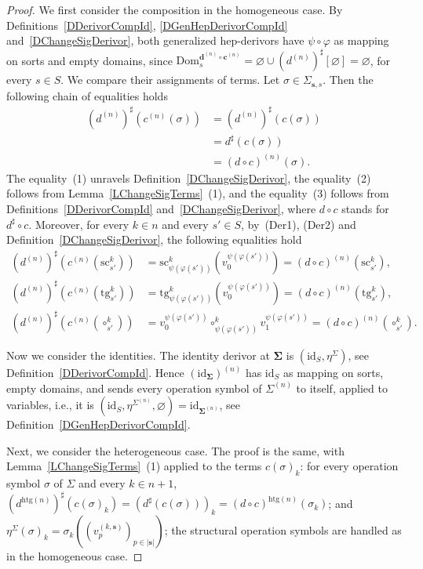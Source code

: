 \documentclass[a4paper, reqno]{amsbook}
\newcommand{\bb}[1]{\ensuremath{\lvert #1 \rvert}}
\newcommand{\sig}[1]{\mathbf{#1}}             %
\newcommand{\Dom}{\mathrm{Dom}}
\newcommand{\htg}{\mathrm{htg}}                %
\newcommand{\id}{\mathrm{id}}
\newcommand{\src}{\mathrm{sc}}
\newcommand{\tgt}{\mathrm{tg}}
\theoremstyle{plain}
\theoremstyle{definition}
\begin{document}
\begin{proof}
We first consider the composition in the homogeneous case.
By Definitions~\ref{DDerivorCompId}, \ref{DGenHepDerivorCompId} and~\ref{DChangeSigDerivor}, both generalized hep-derivors have $\psi\circ\varphi$ as mapping on sorts and empty domains, since $\Dom^{\mathbf{d}^{(n)}\circ\mathbf{c}^{(n)}}_{s}=\varnothing\cup(d^{(n)})^{\sharp}[\varnothing]=\varnothing$, for every $s\in S$.
We compare their assignments of terms.
Let $\sigma\in\Sigma_{\mathbf{s},s}$.
Then the following chain of equalities holds
\begin{align*}
(d^{(n)})^{\sharp}\left(c^{(n)}(\sigma)\right)
&=
(d^{(n)})^{\sharp}\left(c(\sigma)\right)
\tag{1}
\\&=
d^{\sharp}\left(c(\sigma)\right)
\tag{2}
\\&=
(d\circ c)^{(n)}(\sigma).
\tag{3}
\end{align*}
The equality~(1) unravels Definition~\ref{DChangeSigDerivor}, the equality~(2) follows from Lemma~\ref{LChangeSigTerms}~(1), and the equality~(3) follows from Definitions~\ref{DDerivorCompId} and~\ref{DChangeSigDerivor}, where $d\circ c$ stands for $d^{\sharp}\circ c$.
Moreover, for every $k\in n$ and every $s'\in S$, by~(Der1), (Der2) and Definition~\ref{DChangeSigDerivor}, the following equalities hold
\begin{align*}
(d^{(n)})^{\sharp}\left(c^{(n)}(\src^{k}_{s'})\right)&=\src^{k}_{\psi(\varphi(s'))}\left(v^{\psi(\varphi(s'))}_{0}\right)=(d\circ c)^{(n)}(\src^{k}_{s'}),\\
(d^{(n)})^{\sharp}\left(c^{(n)}(\tgt^{k}_{s'})\right)&=\tgt^{k}_{\psi(\varphi(s'))}\left(v^{\psi(\varphi(s'))}_{0}\right)=(d\circ c)^{(n)}(\tgt^{k}_{s'}),\\
(d^{(n)})^{\sharp}\left(c^{(n)}(\circ^{k}_{s'})\right)&=v^{\psi(\varphi(s'))}_{0}\circ^{k}_{\psi(\varphi(s'))}v^{\psi(\varphi(s'))}_{1}=(d\circ c)^{(n)}(\circ^{k}_{s'}).
\end{align*}

Now we consider the identities.
The identity derivor at $\sig{\Sigma}$ is $(\id_{S},\eta^{\Sigma})$, see Definition~\ref{DDerivorCompId}.
Hence $(\id_{\sig{\Sigma}})^{(n)}$ has $\id_{S}$ as mapping on sorts, empty domains, and sends every operation symbol of $\Sigma^{(n)}$ to itself, applied to variables, i.e., it is $(\id_{S},\eta^{\Sigma^{(n)}},\varnothing)=\id_{\sig{\Sigma}^{(n)}}$, see Definition~\ref{DGenHepDerivorCompId}.

Next, we consider the heterogeneous case.
The proof is the same, with Lemma~\ref{LChangeSigTerms}~(1) applied to the terms $c(\sigma)_{k}$: for every operation symbol $\sigma$ of $\Sigma$ and every $k\in n+1$, $(d^{\htg(n)})^{\sharp}(c(\sigma)_{k})=(d^{\sharp}(c(\sigma)))_{k}=(d\circ c)^{\htg(n)}(\sigma_{k})$; and $\eta^{\Sigma}(\sigma)_{k}=\sigma_{k}((v^{(k,\mathbf{s})}_{p})_{p\in\bb{\mathbf{s}}})$; the structural operation symbols are handled as in the homogeneous case.
\end{proof}
\end{document}
